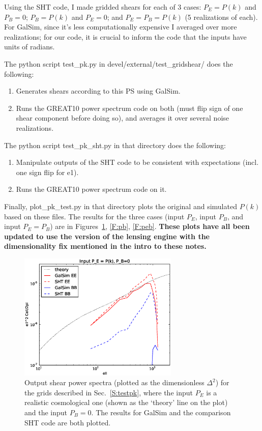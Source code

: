 \documentclass[preprint]{aastex}
\begin{document}
Using the SHT code, I made gridded shears for each of 3 cases:
$P_E=P(k)$ and $P_B=0$; $P_B=P(k)$ and $P_E=0$; and $P_E=P_B=P(k)$ (5
realizations of each).
For GalSim, since it's less computationally expensive I averaged over
more realizations; for our code, it is crucial to inform the code that
the inputs have units of radians.

The python script test\_pk.py in devel/external/test\_gridshear/ does the following:
\begin{enumerate}
\item Generates shears according to this PS using GalSim.
\item Runs the GREAT10 power spectrum code on both (must flip sign of
  one shear component before doing so), and averages it over several
  noise realizations.
\end{enumerate}

The python script test\_pk\_sht.py in that directory does the following:
\begin{enumerate}
\item Manipulate outputs of the SHT code to be consistent with
  expectations (incl. one sign flip for e1).
\item Runs the GREAT10 power spectrum code on it.
\end{enumerate}

Finally, plot\_pk\_test.py in that directory plots the original and
simulated $P(k)$ based on these files.  The results for the three
cases (input $P_E$, input $P_B$, and input $P_E=P_B$) are in
Figures~\ref{F:pe}, \ref{F:pb}, \ref{F:peb}.  \textbf{These plots have
  all been updated to use the version of the lensing engine with the
  dimensionality fix mentioned in the intro to these notes.}

\begin{figure}
\begin{center}
\includegraphics[width=3in]{../external/test_gridshear/output/compare_input_pe.eps}
\caption{Output shear power spectra (plotted as the dimensionless
  $\Delta^2$) for the grids described in Sec.~\ref{S:testpk}, where
  the input $P_E$ is a realistic cosmological one (shown as the `theory' line on
  the plot) and the input $P_B=0$. The results for GalSim and the
  comparison SHT code are both plotted.\label{F:pe}}
\end{center}
\end{figure}
\end{document}
